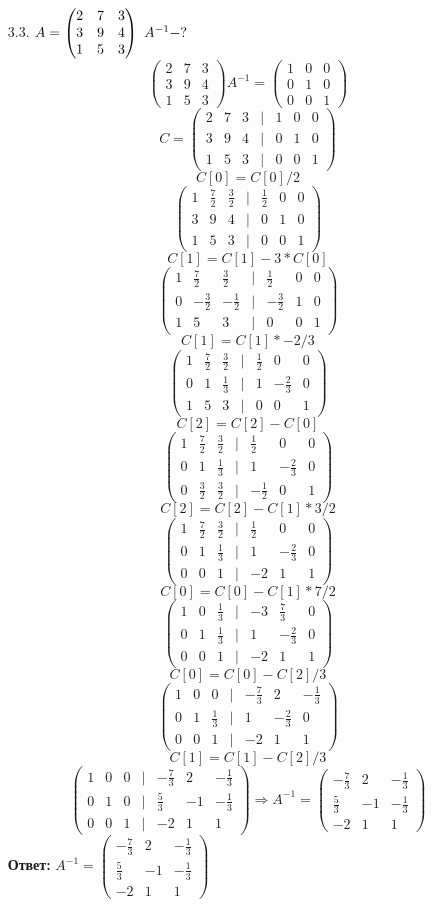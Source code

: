 \documentclass[a4paper]{article}
\newcommand{\mat}[1]{\begin{pmatrix} #1 \end{pmatrix}}
\renewcommand{\f}[2]{\frac{#1}{#2}}
\newcommand{\ts}{\text{\space}}
\renewcommand{\r}{\Rightarrow}
\begin{document}
\begin{enumerate}
\begin{enumerate}
        \item[3.3.]
        $A = \mat{2 & 7 & 3 \\ 3 & 9 & 4 \\ 1 & 5 & 3} \ts A^{-1} - ?$
        $$\mat{2 & 7 & 3 \\ 3 & 9 & 4 \\ 1 & 5 & 3}A^{-1} = \mat{1 & 0 & 0\\ 0 & 1 & 0 \\ 0 & 0 & 1}$$
        $$C = \mat{2 & 7 & 3 & | & 1 & 0 & 0\\ 3 & 9 & 4 & | & 0 & 1 & 0 \\ 1 & 5 & 3 & | & 0 & 0 & 1}$$
        $$C[0] = C[0]/2$$
        $$\mat{1 & \f{7}{2} & \f{3}{2} & | & \f{1}{2} & 0 & 0 \\ 3 & 9 & 4 & | & 0 & 1 & 0 \\ 1 & 5 & 3 & | & 0 & 0 & 1}$$
        $$C[1] = C[1] - 3*C[0]$$
        $$\mat{1 & \f{7}{2} & \f{3}{2} & | & \f{1}{2} & 0 & 0 \\ 0 & -\f{3}{2} & -\f{1}{2} & | & -\f{3}{2} & 1 & 0 \\ 1 & 5 & 3 & | & 0 & 0 & 1}$$
        $$C[1] = C[1]*-2/3$$
        $$\mat{1 & \f{7}{2} & \f{3}{2} & | & \f{1}{2} & 0 & 0 \\ 0 & 1 & \f{1}{3} & | & 1 & -\f{2}{3} & 0 \\ 1 & 5 & 3 & | & 0 & 0 & 1}$$
        $$C[2] = C[2] - C[0]$$
        $$\mat{1 & \f{7}{2} & \f{3}{2} & | & \f{1}{2} & 0 & 0 \\ 0 & 1 & \f{1}{3} & | & 1 & -\f{2}{3} & 0 \\ 0 & \f{3}{2} & \f{3}{2} & | & -\f{1}{2} & 0 & 1}$$
        $$C[2] = C[2]-C[1]*3/2$$
        $$\mat{1 & \f{7}{2} & \f{3}{2} & | & \f{1}{2} & 0 & 0 \\ 0 & 1 & \f{1}{3} & | & 1 & -\f{2}{3} & 0 \\ 0 & 0 & 1 & | & -2 & 1 & 1}$$
        $$C[0] = C[0] - C[1]*7/2$$
        $$\mat{1 & 0 & \f{1}{3} & | & -3 & \f{7}{3} & 0 \\ 0 & 1 & \f{1}{3} & | & 1 & -\f{2}{3} & 0 \\ 0 & 0 & 1 & | & -2 & 1 & 1}$$
        $$C[0] = C[0] - C[2]/3$$
        $$\mat{1 & 0 & 0 & | & -\f{7}{3} & 2 & -\f{1}{3} \\ 0 & 1 & \f{1}{3} & | & 1 & -\f{2}{3} & 0 \\ 0 & 0 & 1 & | & -2 & 1 & 1}$$
        $$C[1] = C[1] - C[2]/3$$
        $$\mat{1 & 0 & 0 & | & -\f{7}{3} & 2 & -\f{1}{3} \\ 0 & 1 & 0 & | & \f{5}{3} & -1 & -\f{1}{3} \\ 0 & 0 & 1 & | & -2 & 1 & 1} \r A^{-1}= \mat{-\f{7}{3} & 2 & -\f{1}{3} \\ \f{5}{3} & -1 & -\f{1}{3} \\ -2 & 1 & 1}$$
        \textbf{Ответ: } $A^{-1}= \mat{-\f{7}{3} & 2 & -\f{1}{3} \\ \f{5}{3} & -1 & -\f{1}{3} \\ -2 & 1 & 1}$
    \end{enumerate}


\end{enumerate}
\end{document}
